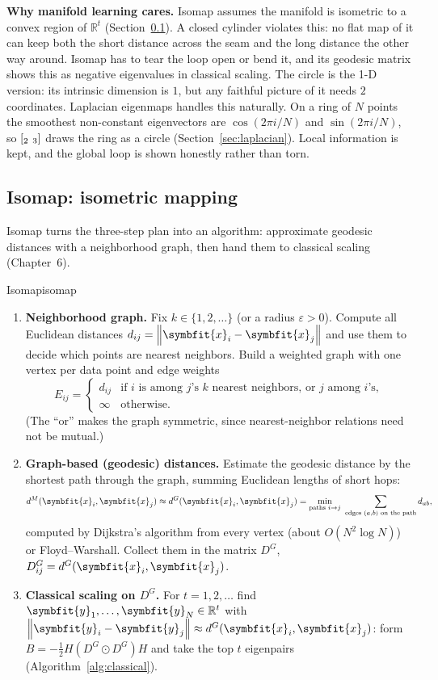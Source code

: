 \documentclass[11pt]{article}
\newcommand{\bm}[1]{\symbfit{#1}}
\newcommand{\R}{\mathbb{R}}
\newcommand{\vx}{\bm{x}}
\let\vv\relax\newcommand{\vv}{\bm{v}}
\newcommand{\norm}[1]{\left\lVert #1\right\rVert}
\newcommand{\had}{\odot}
\begin{document}
\begin{deeper}
\textbf{Why manifold learning cares.} Isomap assumes the manifold is isometric to a convex region of $\R^t$ (Section~\ref{sec:isomap}). A closed
cylinder violates this: no flat map of it can keep both the short distance across the seam and the long distance the other way around. Isomap
has to tear the loop open or bend it, and its geodesic matrix shows this as negative eigenvalues in classical scaling. The circle is the
1-D version: its intrinsic dimension is $1$, but any faithful picture of it needs $2$ coordinates. Laplacian eigenmaps handles this naturally. On a ring
of $N$ points the smoothest non-constant eigenvectors are $\cos(2\pi i/N)$ and $\sin(2\pi i/N)$, so $[\vv_2\ \vv_3]$ draws the ring as a circle
(Section~\ref{sec:laplacian}). Local information is kept, and the global loop is shown honestly rather than torn.
\end{deeper}

\subsection{Isomap: isometric mapping}\label{sec:isomap}

Isomap turns the three-step plan into an algorithm: approximate geodesic distances with a neighborhood graph, then
hand them to classical scaling (Chapter~6).

\begin{algorithm}{Isomap}{isomap}
\begin{enumerate}[label=\arabic*)]
\item \textbf{Neighborhood graph.} Fix $k\in\{1,2,\dots\}$ (or a radius $\varepsilon>0$). Compute all Euclidean distances $d_{ij}=\norm{\vx_i-\vx_j}$ and use them to
decide which points are nearest neighbors. Build a weighted graph with one vertex per data point and edge weights
\[
E_{ij}=\begin{cases}d_{ij}&\text{if $i$ is among $j$'s $k$ nearest neighbors, or $j$ among $i$'s},\\ \infty&\text{otherwise.}\end{cases}
\]
(The ``or'' makes the graph symmetric, since nearest-neighbor relations need not be mutual.)
\item \textbf{Graph-based (geodesic) distances.} Estimate the geodesic distance by the shortest path through the graph,
summing Euclidean lengths of short hops:
\[
d^M(\vx_i,\vx_j)\approx d^G(\vx_i,\vx_j)=\min_{\text{paths }i\to j}\ \sum_{\text{edges }(a,b)\text{ on the path}}d_{ab} ,
\]
computed by Dijkstra's algorithm from every vertex (about $O(N^2\log N)$) or Floyd--Warshall. Collect them in the matrix
$D^G$, $D^G_{ij}=d^G(\vx_i,\vx_j)$.
\item \textbf{Classical scaling on $D^G$.} For $t=1,2,\dots$ find $\bm y_1,\dots,\bm y_N\in\R^t$ with $\norm{\bm y_i-\bm y_j}\approx d^G(\vx_i,\vx_j)$: form
$B=-\tfrac12H(D^G\had D^G)H$ and take the top $t$ eigenpairs (Algorithm~\ref{alg:classical}).
\end{enumerate}
\end{algorithm}
\end{document}
